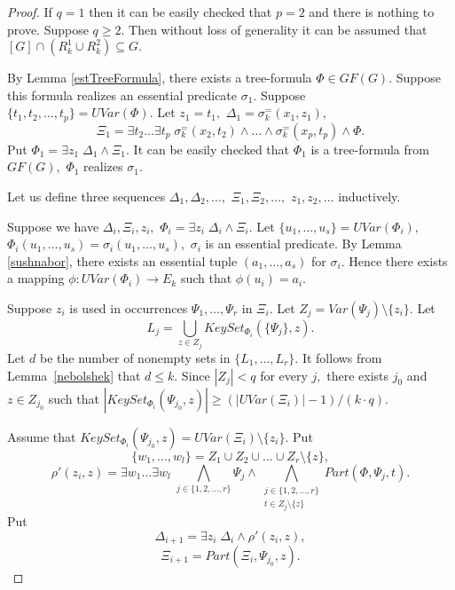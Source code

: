 \documentclass{au}
\theoremstyle{plain}
\theoremstyle{definition}
\theoremstyle{remark}
\numberwithin{equation}{section}
\begin{document}
\begin{proof}

If $q=1$ then it can be easily checked that $p = 2$ and
there is nothing to prove.
Suppose $q\ge 2.$ Then without loss of generality it can be assumed that
$[G]\cap (R_{k}^{1}\cup R_{k}^{2}) \subseteq G.$

By Lemma \ref{estTreeFormula}, there exists a tree-formula $\Phi\in GF(G).$
Suppose this formula realizes an essential predicate $\sigma_{1}.$
Suppose $\{t_{1},t_{2},\ldots,t_{p}\} = UVar(\Phi).$
Let $z_{1} = t_{1},$
$\Delta_{1} = \sigma_{k}^{=}(x_{1},z_{1}),$
$$\Xi_{1} = \exists t_{2}\ldots\exists t_{p}\;
\sigma_{k}^{=}(x_{2},t_{2})\wedge \ldots \wedge
\sigma_{k}^{=}(x_{p},t_{p})\wedge \Phi.$$
Put $\Phi_{1} = \exists z_{1}\; \Delta_{1}\wedge \Xi_{1}.$
It can be easily checked that
$\Phi_{1}$ is a tree-formula from $GF(G),$ $\Phi_{1}$ realizes $\sigma_{1}.$

Let us define three sequences
$\Delta_{1},\Delta_{2},\ldots,$
$\Xi_{1},\Xi_{2},\ldots,$
$z_{1},z_{2},\ldots$ inductively.

Suppose we have $\Delta_{i},\Xi_{i},z_{i},$
$\Phi_{i} = \exists z_{i}\; \Delta_{i}\wedge \Xi_{i}.$
Let $\{u_{1},\ldots,u_{s}\} = UVar(\Phi_{i}),$
$\Phi_{i}(u_{1},\ldots,u_{s}) = \sigma_{i}(u_{1},\ldots,u_{s}),$
$\sigma_{i}$ is an essential predicate.
By Lemma \ref{sushnabor}, there exists an essential tuple $(a_{1},\ldots,a_{s})$ for $\sigma_{i}.$
Hence there exists a mapping $\phi:UVar(\Phi_{i})\rightarrow E_{k}$ such that
$\phi(u_{i}) = a_{i}.$

Suppose $z_{i}$ is used in occurrences $\Psi_{1},\ldots,\Psi_{r}$ in $\Xi_{i}.$
Let $Z_{j} = Var(\Psi_{j})\setminus \{z_{i}\}.$
Let $$L_{j} = \bigcup\limits_{z\in Z_{j}} KeySet_{\Phi_{i}}(\{\Psi_{j}\},z).$$
Let $d$ be the number of nonempty sets in $\{L_{1},\ldots,L_{r}\}.$
It follows from Lemma~\ref{nebolshek} that $d\le k.$
Since $|Z_{j}|<q$ for every $j,$
there exists $j_{0}$ and $z\in Z_{j_{0}}$ such that
$|KeySet_{\Phi_{i}}(\Psi_{j_{0}},z)|\ge(|UVar(\Xi_{i})|-1) /(k\cdot q).$

Assume that $KeySet_{\Phi_{i}}(\Psi_{j_{0}},z) = UVar(\Xi_{i})\setminus\{z_{i}\}.$
Put $$\{w_{1},\ldots,w_{l}\} = Z_{1}\cup Z_{2}\cup\ldots \cup Z_{r}\setminus \{z\},$$
$$\rho'(z_{i},z) =
\exists w_{1}\ldots \exists w_{l} \;
\bigwedge\limits_{j\in \{1,2,\ldots,r\}} \Psi_{j} \wedge
\bigwedge\limits_{\substack{j\in \{1,2,\ldots,r\}\\ t\in Z_{j}\setminus \{z\}}} Part(\Phi, \Psi_{j}, t).$$
Put $$\Delta_{i+1} =
\exists z_{i}\;
\Delta_{i}\wedge \rho'(z_{i},z),$$
$$\Xi_{i+1} = Part(\Xi_{i}, \Psi_{j_{0}}, z).$$


\end{proof}
\end{document}
